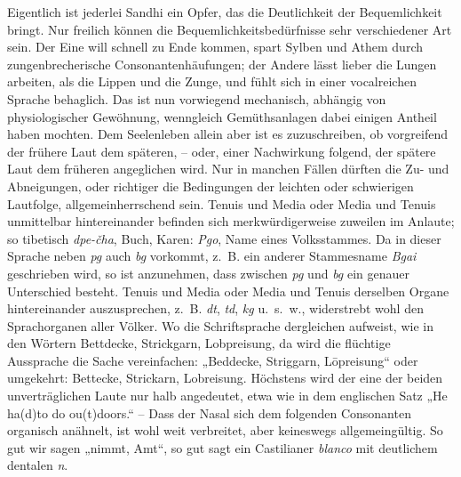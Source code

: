 {Eigentlich ist jederlei Sandhi ein Opfer, das die Deutlichkeit der Bequemlichkeit bringt. Nur freilich können die Bequemlichkeitsbedürfnisse sehr verschiedener Art sein. Der Eine will schnell zu Ende kommen, spart Sylben und Athem durch zungenbrecherische Consonantenhäufungen; der Andere lässt lieber die Lungen arbeiten, als die Lippen und die Zunge, und fühlt sich in einer vocalreichen Sprache behaglich. Das ist nun vorwiegend mechanisch, abhängig von physiologischer Gewöhnung, wenngleich Gemüthsanlagen dabei einigen Antheil haben mochten. Dem Seelenleben allein aber ist es zuzuschreiben, ob vorgreifend der frühere Laut dem späteren, – oder, einer Nachwirkung folgend, der spätere Laut dem früheren angeglichen wird. Nur in manchen Fällen dürften die Zu- und Abneigungen, oder richtiger die Bedingungen der leichten oder schwierigen Lautfolge, allgemeinherrschend sein. Tenuis und Media oder Media und Tenuis unmittelbar hintereinander befinden sich merkwürdigerweise zuweilen im Anlaute; so tibetisch \textit{dpe-čha}, Buch,  Karen: \textit{Pgo}, Name eines Volksstammes. Da in dieser Sprache neben \textit{pg} auch \textit{bg} vorkommt, z.~B. ein anderer Stammesname \textit{Bgai} geschrieben wird, so ist anzunehmen, dass zwischen \textit{pg} und \textit{bg} ein genauer Unterschied besteht. Tenuis und Media oder Media und Tenuis derselben Organe hintereinander auszusprechen, z.~B. \textit{dt}, \textit{td}, \textit{kg} u.~s.~w., widerstrebt wohl den Sprachorganen aller Völker. Wo die Schriftsprache dergleichen aufweist, wie in den Wörtern Bettdecke, Strickgarn, Lobpreisung, da wird die flüchtige Aussprache die Sache vereinfachen: „Beddecke, Striggarn, Lōpreisung“ oder umgekehrt: Bettecke, Strickarn, Lobreisung. Höchstens wird der eine der beiden unverträglichen Laute nur halb angedeutet, etwa wie in dem englischen Satz „He ha(d)to do ou(t)doors.“ – Dass der Nasal sich dem folgenden Consonanten organisch anähnelt, ist wohl weit verbreitet, aber keineswegs allgemeingültig. So gut wir \label{fp.207} sagen „nimmt, Amt“, so gut sagt ein Castilianer \textit{blanco} mit deutlichem dentalen \textit{n}.

}
